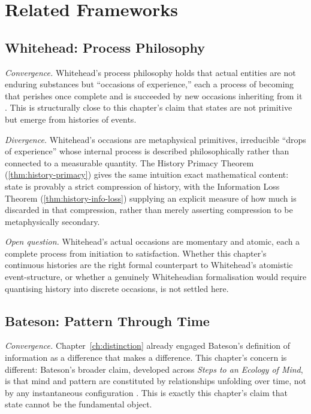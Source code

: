 \documentclass[12pt,twoside,openright]{book}
\begin{document}
\section{Related Frameworks}
\label{sec:ch4-related-frameworks}

\subsection*{Whitehead: Process Philosophy}

\emph{Convergence.} Whitehead's process philosophy holds that
actual entities are not enduring substances but ``occasions of
experience,'' each a process of becoming that perishes once
complete and is succeeded by new occasions inheriting from it
\parencite{whitehead1929}. This is structurally close to this
chapter's claim that states are not primitive but emerge from
histories of events.

\emph{Divergence.} Whitehead's occasions are metaphysical
primitives, irreducible ``drops of experience'' whose internal
process is described philosophically rather than connected to a
measurable quantity. The History Primacy Theorem
(\cref{thm:history-primacy}) gives the same intuition exact
mathematical content: state is provably a strict compression of
history, with the Information Loss Theorem
(\cref{thm:history-info-loss}) supplying an explicit measure of
how much is discarded in that compression, rather than merely
asserting compression to be metaphysically secondary.

\emph{Open question.} Whitehead's actual occasions are momentary
and atomic, each a complete process from initiation to
satisfaction. Whether this chapter's continuous histories are
the right formal counterpart to Whitehead's atomistic
event-structure, or whether a genuinely Whiteheadian
formalisation would require quantising history into discrete
occasions, is not settled here.

\subsection*{Bateson: Pattern Through Time}

\emph{Convergence.} Chapter~\ref{ch:distinction} already engaged
Bateson's definition of information as a difference that makes a
difference. This chapter's concern is different: Bateson's
broader claim, developed across \emph{Steps to an Ecology of
Mind}, is that mind and pattern are constituted by relationships
unfolding over time, not by any instantaneous configuration
\parencite{bateson1972}. This is exactly this chapter's claim
that state cannot be the fundamental object.
\end{document}
